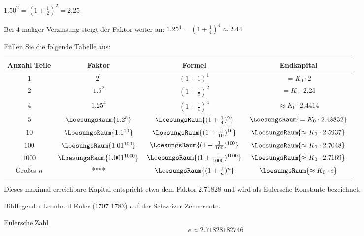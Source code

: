 $1.50^2  = (1 + \frac12)^2 = 2.25$

Bei 4-maliger Verzinsung steigt der Faktor weiter an:
$1.25^4 = (1 + \frac14)^4 \approx 2.44 $

Füllen Sie die folgende Tabelle aus:

\begin{tabular}{c|c|c|c} 
  Anzahl Teile  & Faktor                      & Formel          & Endkapital \\ \hline
  $1$           & $2^1$                      & $(1+1)^1$ & $= K_0 \cdot{} 2 $ \\ \hline
  $2$           & $1.5^2$                      & $(1+\frac12)^2$ & $= K_0 \cdot{} 2.25 $ \\ \hline
  $4$           & $1.25^4$                  & $(1+\frac14)^4$ & $\approx K_0 \cdot{} 2.4414 $ \\ \hline
  $5$           & $\LoesungsRaum{1.2^5}$  & $\LoesungsRaum{(1+\frac14)^2}$ & $\LoesungsRaum{= K_0 \cdot{} 2.48832} $ \\ \hline
  $10$           & $\LoesungsRaum{1.1^{10}}$  & $\LoesungsRaum{(1+\frac{1}{10})^{10}}$ & $\LoesungsRaum{\approx K_0 \cdot{} 2.5937} $ \\ \hline
  $100$           & $\LoesungsRaum{1.01^{100}}$  & $\LoesungsRaum{(1+\frac{1}{100})^{100}}$ & $\LoesungsRaum{\approx K_0 \cdot{} 2.7048 }$ \\ \hline
  $1000$           & $\LoesungsRaum{1.001^{1000}}$  & $\LoesungsRaum{(1+\frac{1}{1000})^{1000}}$ & $\LoesungsRaum{\approx K_0 \cdot{} 2.7169 }$ \\ \hline
  Großes $n$           & ****  & $\LoesungsRaum{(1+\frac{1}{n})^{n}}$ & $\LoesungsRaum{\approx K_0 \cdot{} e }$ \\ \hline
\end{tabular} 

Dieses maximal erreichbare Kapital entspricht etwa dem Faktor 2.71828 und
wird als Eulersche Konstante bezeichnet.

Bildlegende: Leonhard Euler (1707-1783) auf der Schweizer Zehnernote.

\begin{definition}{Eulersche Zahl}{}
$$e \approx 2.71828182746$$
\end{definition}
\newpage
